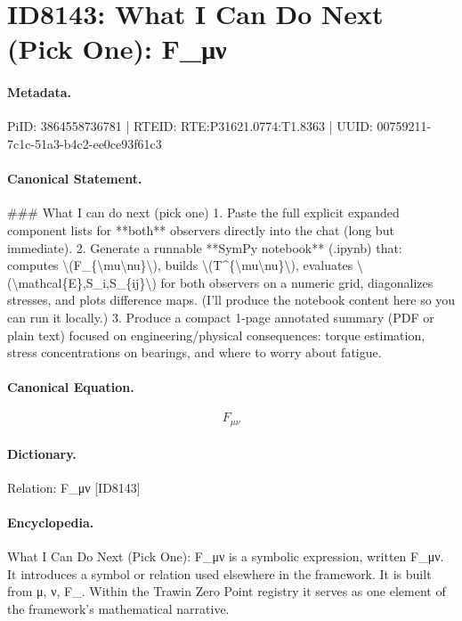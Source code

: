 \section*{ID8143: What I Can Do Next (Pick One): F\_μν}
\paragraph{Metadata.}
PiID: 3864558736781 | RTEID: RTE:P31621.0774:T1.8363 | UUID: 00759211-7c1c-51a3-b4c2-ee0ce93f61c3

\paragraph{Canonical Statement.}
\#\#\# What I can do next (pick one) 1. Paste the full explicit expanded component lists for **both** observers directly into the chat (long but immediate). 2. Generate a runnable **SymPy notebook** (.ipynb) that: computes \textbackslash{}(F\_\{\textbackslash{}mu\textbackslash{}nu\}\textbackslash{}), builds \textbackslash{}(T\textasciicircum{}\{\textbackslash{}mu\textbackslash{}nu\}\textbackslash{}), evaluates \textbackslash{}(\textbackslash{}mathcal\{E\},S\_i,S\_\{ij\}\textbackslash{}) for both observers on a numeric grid, diagonalizes stresses, and plots difference maps. (I’ll produce the notebook content here so you can run it locally.) 3. Produce a compact 1-page annotated summary (PDF or plain text) focused on engineering/physical consequences: torque estimation, stress concentrations on bearings, and where to worry about fatigue.

\paragraph{Canonical Equation.}
\[
F_{\mu\nu}
\]

\paragraph{Dictionary.}
Relation: F\_μν [ID8143]

\paragraph{Encyclopedia.}
What I Can Do Next (Pick One): F\_μν is a symbolic expression, written F\_μν. It introduces a symbol or relation used elsewhere in the framework. It is built from μ, ν, F\_. Within the Trawin Zero Point registry it serves as one element of the framework's mathematical narrative.
